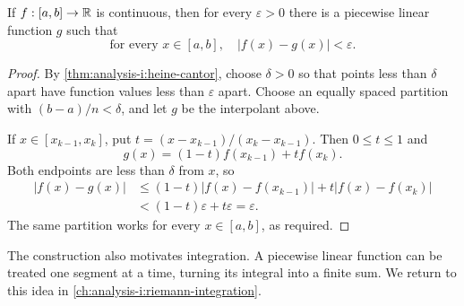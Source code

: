 \begin{proposition}
  \label{thm:analysis-i:polygonal-approximation}
  If $f:[a,b]\to\mathbb{R}$ is continuous, then for every $\varepsilon>0$
  there is a piecewise linear function $g$ such that
  \[
    \text{for every }x\in[a,b],\quad |f(x)-g(x)|<\varepsilon.
  \]
\end{proposition}


\begin{proof}
  By \autoref{thm:analysis-i:heine-cantor}, choose $\delta>0$ so that
  points less than $\delta$ apart have function values less than
  $\varepsilon$ apart. Choose an equally spaced partition with
  $(b-a)/n<\delta$, and let $g$ be the interpolant above.

  If $x\in[x_{k-1},x_k]$, put
  $t=(x-x_{k-1})/(x_k-x_{k-1})$. Then $0\le t\le1$ and
  \[
    g(x)=(1-t)f(x_{k-1})+tf(x_k).
  \]
  Both endpoints are less than $\delta$ from $x$, so
  \begin{align*}
    |f(x)-g(x)|
      &\le (1-t)|f(x)-f(x_{k-1})|
        +t|f(x)-f(x_k)|\\
      &< (1-t)\varepsilon+t\varepsilon=\varepsilon.
  \end{align*}
  The same partition works for every $x\in[a,b]$, as required.
\end{proof}


The construction also motivates integration. A piecewise linear function
can be treated one segment at a time, turning its integral into a finite
sum. We return to this idea in
\autoref{ch:analysis-i:riemann-integration}.
